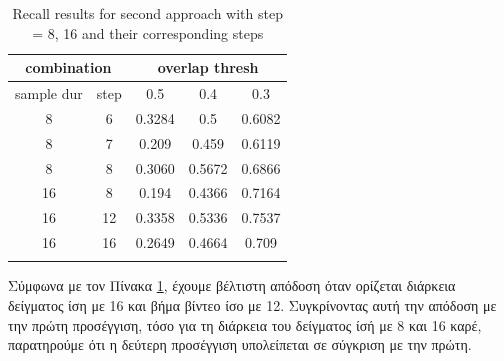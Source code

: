 \documentclass{report}
\newcommand{\en}{\selectlanguage{english}}
\begin{document}
\begin{center}
\en
\begin{longtable}{||c c||c c c||}
  \hline
  \multicolumn{2}{||c||}{\textbf{combination}} &\multicolumn{3}{|c||}{\textbf{overlap thresh}}\\

  \hline
  sample dur & step &   0.5  &  0.4 &  0.3 \\
  \hline   \hline
  8 & 6 & 0.3284 & 0.5 & 0.6082  \\
  \hline
  8 & 7 & 0.209	& 0.459 & 0.6119 \\
  \hline
  8 & 8 & 0.3060 & 0.5672 & 0.6866 \\
  \hline
  16 & 8  & 0.194 & 0.4366 & 0.7164 \\
  \hline
  16 & 12 & 0.3358 & 0.5336 & 0.7537 \\
  \hline
  16 & 16 & 0.2649 & 0.4664 & 0.709 \\
  
  \hline     \hline                          

  \caption{Recall results for second approach with step = 8, 16 and their corresponding steps }
  \label{table:conn_app2}
\end{longtable} 
\end{center}

Σύμφωνα με τον Πίνακα \ref{table:conn_app2}, έχουμε βέλτιστη απόδοση όταν ορίζεται διάρκεια δείγματος ίση με 16 και  βήμα βίντεο ίσο με 12.
Συγκρίνοντας αυτή την απόδοση με την πρώτη προσέγγιση, τόσο για τη διάρκεια του δείγματος ίσή  με 8 και 16 καρέ, παρατηρούμε  ότι η δεύτερη
προσέγγιση υπολείπεται σε σύγκριση με την πρώτη.
\end{document}
